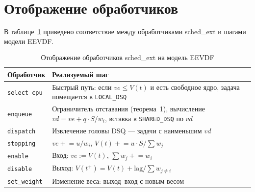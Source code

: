 \documentclass[12pt, oneside]{book}
\newenvironment{customquote}
{\list{}{\leftmargin=0.5cm
                \rightmargin=0.5cm
                \topsep=0pt
                \partopsep=0pt
                \parsep=2pt
                \itemsep=0pt
        }%
        \normalfont\relax
\item\relax}
{\endlist}
\begin{document}
\section{Отображение обработчиков}
\begin{customquote}
        \quad В таблице~\ref{tab:eevdf_ops} приведено
        соответствие между обработчиками sched\_ext и
        шагами модели EEVDF.

        \begin{table}[!ht]
                \centering
                \caption{Отображение обработчиков
                        sched\_ext на модель EEVDF}
                \label{tab:eevdf_ops}
                \vspace{0.3em}
                \begin{tabular}{|l|p{9.5cm}|}
                        \hline
                        \textbf{Обработчик} &
                                \textbf{Реализуемый шаг} \\
                        \hline
                        \texttt{select\_cpu} &
                                Быстрый путь: если
                                $ve \leq V(t)$ и есть свободное
                                ядро, задача помещается в
                                \texttt{LOCAL\_DSQ} \\
                        \texttt{enqueue} &
                                Ограничитель отставания
                                (теорема~1), вычисление
                                $vd = ve + q \cdot S / w_i$,
                                вставка в
                                \texttt{SHARED\_DSQ} по $vd$ \\
                        \texttt{dispatch} &
                                Извлечение головы DSQ ---
                                задачи с наименьшим $vd$ \\
                        \texttt{stopping} &
                                $ve \mathrel{+}= u / w_i$,
                                $V(t) \mathrel{+}=
                                u \cdot S / \sum w_j$ \\
                        \texttt{enable} &
                                Вход: $ve := V(t)$,
                                $\sum w_j \mathrel{+}= w_i$ \\
                        \texttt{disable} &
                                Выход: $V(t^+) = V(t) +
                                \mathrm{lag}/\sum w_{j \neq i}$ \\
                        \texttt{set\_weight} &
                                Изменение веса:
                                выход--вход с новым весом \\
                        \hline
                \end{tabular}
        \end{table}


\end{customquote}
\end{document}
